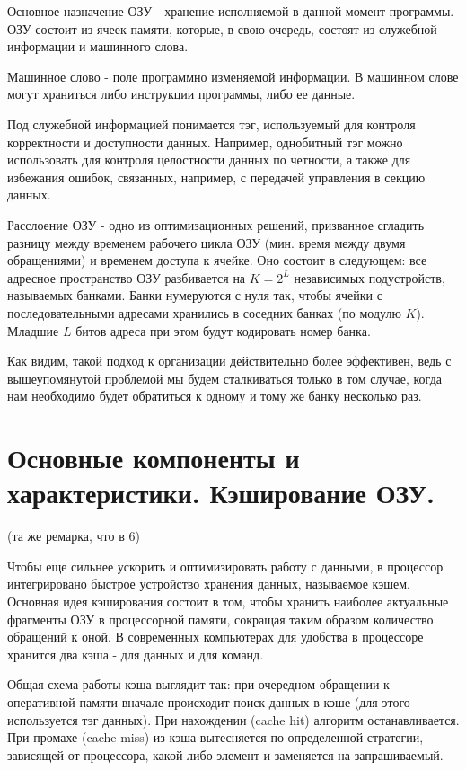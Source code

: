 \documentclass[a4paper,12pt,titlepage,finall]{article}
\begin{document}
Основное назначение ОЗУ - хранение исполняемой в данной момент программы. ОЗУ состоит из ячеек памяти, которые, в свою очередь, состоят из служебной информации и машинного слова. 

Машинное слово - поле программно изменяемой информации. В машинном слове могут храниться либо инструкции программы, либо ее данные.

Под служебной информацией понимается тэг, используемый для контроля корректности и доступности данных. Например, однобитный тэг можно использовать для контроля целостности данных по четности, а также для избежания ошибок, связанных, например, с передачей управления в секцию данных.

Расслоение ОЗУ - одно из оптимизационных решений, призванное сгладить разницу между временем рабочего цикла ОЗУ (мин. время между двумя обращениями) и временем доступа к ячейке. Оно состоит в следующем: все адресное пространство ОЗУ разбивается на $K = 2^L$ независимых подустройств, называемых банками. Банки нумеруются с нуля так, чтобы ячейки с последовательными адресами хранились в соседних банках (по модулю $K$).
Младшие $L$ битов адреса при этом будут кодировать номер банка.

Как видим, такой подход к организации действительно более эффективен, ведь с вышеупомянутой проблемой мы будем сталкиваться только в том случае, когда нам необходимо будет обратиться к одному и тому же банку несколько раз.

\section{Основные компоненты и характеристики.
Кэширование ОЗУ.}
(та же ремарка, что в 6)

Чтобы еще сильнее ускорить и оптимизировать работу с данными, в процессор интегрировано быстрое устройство хранения данных, называемое кэшем. Основная идея кэширования состоит в том, чтобы хранить наиболее актуальные фрагменты ОЗУ в процессорной памяти, сокращая таким образом количество обращений к оной. В современных компьютерах для удобства в процессоре хранится два кэша - для данных и для команд.

Общая схема работы кэша выглядит так: при очередном обращении к оперативной памяти вначале происходит поиск данных в кэше (для этого используется тэг данных). При нахождении (cache hit) алгоритм останавливается. При промахе (cache miss) из кэша вытесняется по определенной стратегии, зависящей от процессора, какой-либо элемент и заменяется на запрашиваемый. 
\end{document}
